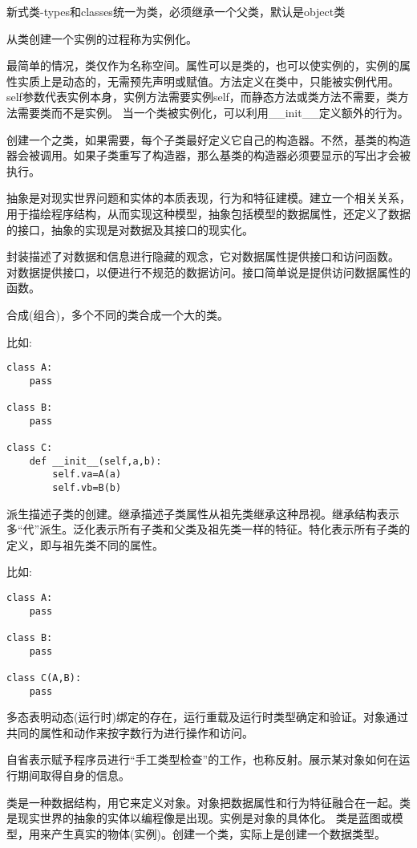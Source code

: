 \documentclass[twoside,11pt]{book}
\begin{document}
新式类-types和classes统一为类，必须继承一个父类，默认是object类


从类创建一个实例的过程称为实例化。

最简单的情况，类仅作为名称空间。属性可以是类的，也可以使实例的，实例的属性实质上是动态的，无需预先声明或赋值。方法定义在类中，只能被实例代用。self参数代表实例本身，实例方法需要实例self，而静态方法或类方法不需要，类方法需要类而不是实例。
当一个类被实例化，可以利用\_\_init\_\_定义额外的行为。

创建一个之类，如果需要，每个子类最好定义它自己的构造器。不然，基类的构造器会被调用。如果子类重写了构造器，那么基类的构造器必须要显示的写出才会被执行。

抽象是对现实世界问题和实体的本质表现，行为和特征建模。建立一个相关关系，用于描绘程序结构，从而实现这种模型，抽象包括模型的数据属性，还定义了数据的接口，抽象的实现是对数据及其接口的现实化。

封装描述了对数据和信息进行隐藏的观念，它对数据属性提供接口和访问函数。
对数据提供接口，以便进行不规范的数据访问。接口简单说是提供访问数据属性的函数。

合成(组合)，多个不同的类合成一个大的类。

比如:
\begin{lstlisting}
class A:
    pass

class B:
    pass

class C:
    def __init__(self,a,b):
        self.va=A(a)
        self.vb=B(b)
\end{lstlisting}



派生描述子类的创建。继承描述子类属性从祖先类继承这种昂视。继承结构表示多“代”派生。泛化表示所有子类和父类及祖先类一样的特征。特化表示所有子类的定义，即与祖先类不同的属性。

比如:
\begin{lstlisting}
class A:
    pass

class B:
    pass

class C(A,B):
    pass
\end{lstlisting}



多态表明动态(运行时)绑定的存在，运行重载及运行时类型确定和验证。对象通过共同的属性和动作来按字数行为进行操作和访问。

自省表示赋予程序员进行“手工类型检查”的工作，也称反射。展示某对象如何在运行期间取得自身的信息。

类是一种数据结构，用它来定义对象。对象把数据属性和行为特征融合在一起。类是现实世界的抽象的实体以编程像是出现。实例是对象的具体化。
类是蓝图或模型，用来产生真实的物体(实例)。创建一个类，实际上是创建一个数据类型。
\end{document}
